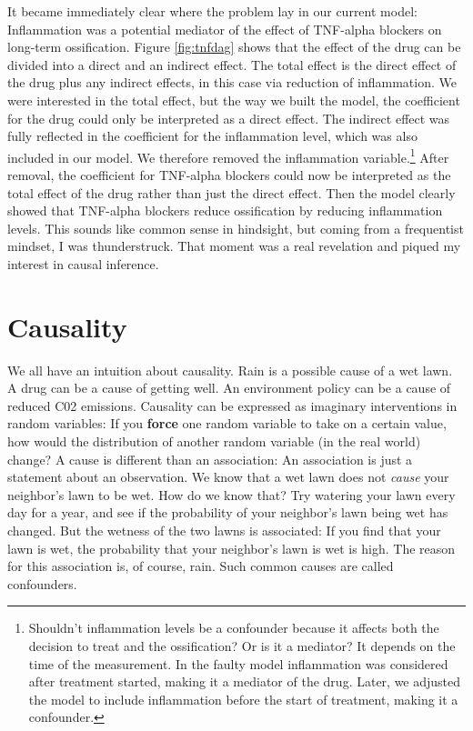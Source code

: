 \documentclass[
  10pt,
]{scrbook}
\begin{document}
It became immediately clear where the problem lay in our current model:
Inflammation was a potential mediator of the effect of TNF-alpha blockers on long-term ossification.
Figure \ref{fig:tnfdag} shows that the effect of the drug can be divided into a direct and an indirect effect.
The total effect is the direct effect of the drug plus any indirect effects, in this case via reduction of inflammation.
We were interested in the total effect, but the way we built the model, the coefficient for the drug could only be interpreted as a direct effect.
The indirect effect was fully reflected in the coefficient for the inflammation level, which was also included in our model.
We therefore removed the inflammation variable.\footnote{Shouldn't inflammation levels be a confounder because it affects both the decision to treat and the ossification? Or is it a mediator? It depends on the time of the measurement. In the faulty model inflammation was considered after treatment started, making it a mediator of the drug. Later, we adjusted the model to include inflammation before the start of treatment, making it a confounder.}
After removal, the coefficient for TNF-alpha blockers could now be interpreted as the total effect of the drug rather than just the direct effect.
Then the model clearly showed that TNF-alpha blockers reduce ossification by reducing inflammation levels.
This sounds like common sense in hindsight, but coming from a frequentist mindset, I was thunderstruck.
That moment was a real revelation and piqued my interest in causal inference.

\hypertarget{causality}{%
\section{Causality}\label{causality}}

We all have an intuition about causality.
Rain is a possible cause of a wet lawn.
A drug can be a cause of getting well.
An environment policy can be a cause of reduced C02 emissions.
Causality can be expressed as imaginary interventions in random variables:
If you \textbf{force} one random variable to take on a certain value, how would the distribution of another random variable (in the real world) change?
A cause is different than an association:
An association is just a statement about an observation.
We know that a wet lawn does not \emph{cause} your neighbor's lawn to be wet.
How do we know that? Try watering your lawn every day for a year, and see if the probability of your neighbor's lawn being wet has changed.
But the wetness of the two lawns is associated:
If you find that your lawn is wet, the probability that your neighbor's lawn is wet is high.
The reason for this association is, of course, rain.
Such common causes are called confounders.
\end{document}
